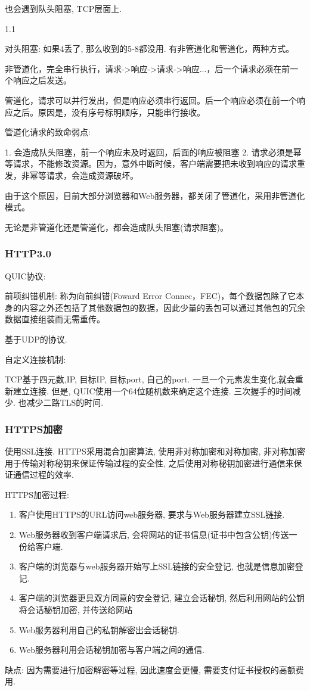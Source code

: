 也会遇到队头阻塞, TCP层面上.

1.1

对头阻塞: 如果4丢了, 那么收到的5-8都没用.
有非管道化和管道化，两种方式。

非管道化，完全串行执行，请求->响应->请求->响应...，后一个请求必须在前一个响应之后发送。

管道化，请求可以并行发出，但是响应必须串行返回。后一个响应必须在前一个响应之后。原因是，没有序号标明顺序，只能串行接收。

管道化请求的致命弱点:

1. 会造成队头阻塞，前一个响应未及时返回，后面的响应被阻塞
2. 请求必须是幂等请求，不能修改资源。因为，意外中断时候，客户端需要把未收到响应的请求重发，非幂等请求，会造成资源破坏。

由于这个原因，目前大部分浏览器和Web服务器，都关闭了管道化，采用非管道化模式。

无论是非管道化还是管道化，都会造成队头阻塞(请求阻塞)。

\subsubsection{HTTP3.0}

QUIC协议:

前项纠错机制: 称为向前纠错(Foward Error Connec，FEC)，每个数据包除了它本身的内容之外还包括了其他数据包的数据，因此少量的丢包可以通过其他包的冗余数据直接组装而无需重传。

基于UDP的协议.

自定义连接机制:

TCP基于四元数,IP, 目标IP, 目标port, 自己的port. 一旦一个元素发生变化,就会重新建立连接.
但是, QUIC使用一个64位随机数来确定这个连接. 三次握手的时间减少. 也减少二路TLS的时间.




\subsubsection{HTTPS加密}
使用SSL连接. HTTPS采用混合加密算法, 使用非对称加密和对称加密, 非对称加密用于传输对称秘钥来保证传输过程的安全性, 之后使用对称秘钥加密进行通信来保证通信过程的效率.
\par
HTTPS加密过程:
\begin{enumerate}
	\item 客户使用HTTPS的URL访问web服务器, 要求与Web服务器建立SSL链接.
	\item Web服务器收到客户端请求后, 会将网站的证书信息(证书中包含公钥)传送一份给客户端.
	\item 客户端的浏览器与web服务器开始写上SSL链接的安全登记, 也就是信息加密登记.
	\item 客户端的浏览器更具双方同意的安全登记, 建立会话秘钥, 然后利用网站的公钥将会话秘钥加密, 并传送给网站
	\item Web服务器利用自己的私钥解密出会话秘钥.
	\item Web服务器利用会话秘钥加密与客户端之间的通信.
\end{enumerate}
\par
缺点: 因为需要进行加密解密等过程, 因此速度会更慢, 需要支付证书授权的高额费用.
